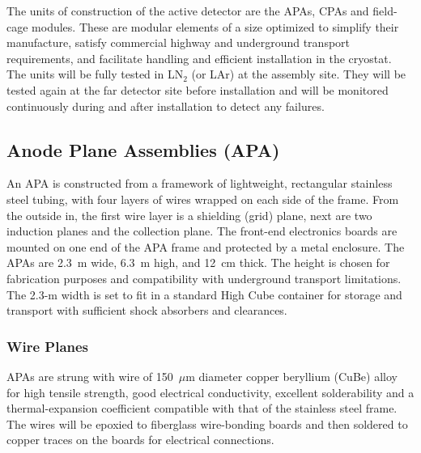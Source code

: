 The units of construction of the active detector are the APAs, CPAs
and field-cage modules. These are modular elements of a size optimized
to simplify their manufacture, satisfy commercial highway and
underground transport requirements, and facilitate handling and efficient
installation in the cryostat.   The units will be
fully tested in LN$_2$ (or LAr) at the assembly site. They will be
tested again at the far detector site before installation and will be
monitored continuously during and after installation to detect any
failures.

\subsection{Anode Plane Assemblies (APA)}
\label{subsec:fd-ref-apa}

An APA is constructed from a framework of lightweight, rectangular
stainless steel tubing, with four layers of wires wrapped on each side
of the frame.  From the outside in, the first wire layer is a
shielding (grid) plane, next are two induction planes and the
collection plane.  The front-end electronics boards are mounted on one
end of the APA frame and protected by a metal enclosure.  The APAs are
2.3~m wide, 6.3~m high, and 12~cm thick. The height is chosen for
fabrication purposes and compatibility with underground transport
limitations. The 2.3-m width is set to fit in a standard High Cube
container for storage and transport with sufficient shock absorbers
and clearances.


\subsubsection{Wire Planes}
\label{subsec:fd-ref-wireplanes}

APAs are strung with wire of 150~$\mu$m diameter copper beryllium
(CuBe) alloy for high tensile strength, good electrical conductivity,
excellent solderability and a thermal-expansion coefficient compatible
with that of the stainless steel frame.  The wires will be epoxied to
fiberglass wire-bonding boards and then soldered to copper traces on
the boards for electrical connections.

